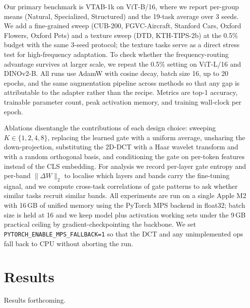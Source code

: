 \documentclass{article}
\begin{document}
Our primary benchmark is VTAB-1k on ViT-B/16, where we report per-group means (Natural, Specialized, Structured) and the 19-task average over 3 seeds. We add a fine-grained sweep (CUB-200, FGVC-Aircraft, Stanford Cars, Oxford Flowers, Oxford Pets) and a texture sweep (DTD, KTH-TIPS-2b) at the 0.5\% budget with the same 3-seed protocol; the texture tasks serve as a direct stress test for high-frequency adaptation. To check whether the frequency-routing advantage survives at larger scale, we repeat the 0.5\% setting on ViT-L/16 and DINOv2-B. All runs use AdamW with cosine decay, batch size 16, up to 20 epochs, and the same augmentation pipeline across methods so that any gap is attributable to the adapter rather than the recipe. Metrics are top-1 accuracy, trainable parameter count, peak activation memory, and training wall-clock per epoch.

Ablations disentangle the contributions of each design choice: sweeping $K\in\{1,2,4,8\}$, replacing the learned gate with a uniform average, unsharing the down-projection, substituting the 2D-DCT with a Haar wavelet transform and with a random orthogonal basis, and conditioning the gate on per-token features instead of the CLS embedding. For analysis we record per-layer gate entropy and per-band $\|\Delta W\|_2$ to localise which layers and bands carry the fine-tuning signal, and we compute cross-task correlations of gate patterns to ask whether similar tasks recruit similar bands. All experiments are run on a single Apple M2 with 16\,GB of unified memory using the PyTorch MPS backend in float32; batch size is held at 16 and we keep model plus activation working sets under the 9\,GB practical ceiling by gradient-checkpointing the backbone. We set \texttt{PYTORCH\_ENABLE\_MPS\_FALLBACK=1} so that the DCT and any unimplemented ops fall back to CPU without aborting the run.

\section{Results}
Results forthcoming.
\end{document}
